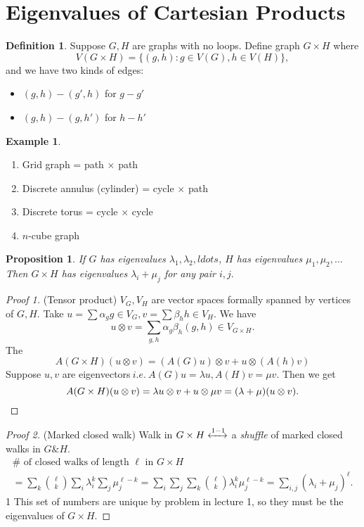 \documentclass{report}
\newcommand{\ie}{\ i.e.\ }
\newtheorem{proposition}{Proposition}[section]
\theoremstyle{definition}
\newtheorem{definition}{Definition}[section]
\newtheorem{example}{Example}[section]
\theoremstyle{remark}
\numberwithin{equation}{section}
\begin{document}
\section{Eigenvalues of Cartesian Products}
\begin{definition}
Suppose $G, H$ are graphs with no loops. Define graph $G \times H$ where \[V(G \times H) = \{(g, h) : g \in V(G), h \in V(H)\},\]
and we have two kinds of edges:
\begin{itemize}
\item $(g, h) - (g', h)$ for $g - g'$
\item $(g, h) - (g, h')$ for $h - h'$
\end{itemize}
\end{definition}
\begin{example}
\begin{enumerate}
\item Grid graph = path $\times$ path
\item Discrete annulus
(cylinder) = cycle $\times$ path
\item Discrete torus = cycle $\times$ cycle
\item $n$-cube graph
\end{enumerate}
\end{example}
\begin{proposition}
If $G$ has eigenvalues $\lambda_1, \lambda_2, ldots$, $H$ has eigenvalues $\mu_1, \mu_2, \ldots$ Then $G \times H$ has eigenvalues $\lambda_i + \mu_j$ for any pair $i, j.$
\end{proposition}
\begin{proof}[Proof 1](Tensor product)
$V_G, V_H$ are vector spaces formally spanned by vertices of $G, H.$ Take $u = \sum \alpha_g g \in V_G, v = \sum \beta_h h \in V_H.$ We have
\[u \otimes v = \sum_{g, h} \alpha_g\beta_h(g, h) \in V_{G \times H}.\]
The 
\[
A(G \times H)(u \otimes v) = (A(G)u) \otimes v + u \otimes (A(h)v)
\]
Suppose $u, v$ are eigenvectors$\ie A(G)u = \lambda u, A(H)v = \mu v.$ Then we get
\[
A(G \times H)(u \otimes v) = \lambda u \otimes v + u \otimes \mu v = (\lambda+\mu)(u \otimes v). \qedhere
\]
\end{proof}

\begin{proof}[Proof 2](Marked closed walk)
Walk in $G \times H \xleftrightarrow[]{1-1}$ a \emph{shuffle} of marked closed walks in $G \& H.$
\begin{multline*}
\# \text{ of closed walks of length $\ell$ in $G \times H$} \\
= \sum_{k} \binom{\ell}{k} \sum_i \lambda_i^k\sum_j \mu_j^{\ell - k}
= \sum_i \sum_j \sum_k \binom{\ell}{k} \lambda_i^{k} \mu_j^{\ell - k}
= \sum_{i, j} (\lambda_i + \mu_j)^\ell.
\end{multline*}1
This set of numbers are unique by problem in lecture 1, so they must be the eigenvalues of $G \times H.$
\end{proof}
\end{document}
